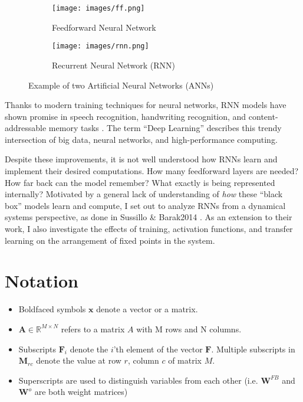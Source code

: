 \documentclass{article} %
\newcommand{\bf}[1]{\mathbf{#1}}
\newcommand{\x}{\bf{x}}
\newcommand{\F}{\bf{F}}
\begin{document}
\begin{figure}
\centering
\begin{subfigure}{.5\textwidth}
  \centering
  \texttt{[image: images/ff.png]}
  \caption{Feedforward Neural Network}
  \label{fig:sub1}
\end{subfigure}%
\begin{subfigure}{.5\textwidth}
  \centering
  \texttt{[image: images/rnn.png]}
  \caption{Recurrent Neural Network (RNN)}
  \label{fig:sub2}
\end{subfigure}
\caption{Example of two Artificial Neural Networks (ANNs)}
\label{fig:test}
\end{figure}

Thanks to modern training techniques for neural networks, RNN models have shown promise in speech recognition, handwriting recognition, and content-addressable memory tasks \cite{DBLP:journals/corr/HannunCCCDEPSSCN14, DBLP:journals/corr/GravesWD14}. The term ``Deep Learning'' describes this trendy intersection of big data, neural networks, and high-performance computing.

Despite these improvements, it is not well understood how RNNs learn and implement their desired computations. How many feedforward layers are needed? How far back can the model remember? What exactly is being represented internally? Motivated by a general lack of understanding of \textit{how} these ``black box'' models learn and compute, I set out to analyze RNNs from a dynamical systems perspective, as done  in Sussillo \& Barak2014 \cite{SussilloBarak2014253}. As an extension to their work, I also investigate the effects of training, activation functions, and transfer learning on the arrangement of fixed points in the system.

\section{Notation}

\begin{itemize}
  \item Boldfaced symbols $\x$ denote a vector or a matrix.
  \item $\bf{A} \in \mathbb{R}^{M \times N}$ refers to a matrix $A$ with M rows and N columns.
  \item Subscripts $\F_i$ denote the $i$'th element of the vector $\F$. Multiple subscripts in $\bf{M}_{rc}$ denote the value at row $r$, column $c$ of matrix $M$.
  \item Superscripts are used to distinguish variables from each other (i.e. $\bf{W}^{FB}$ and $\bf{W}^{o}$ are both weight matrices)
\end{itemize}
\end{document}
